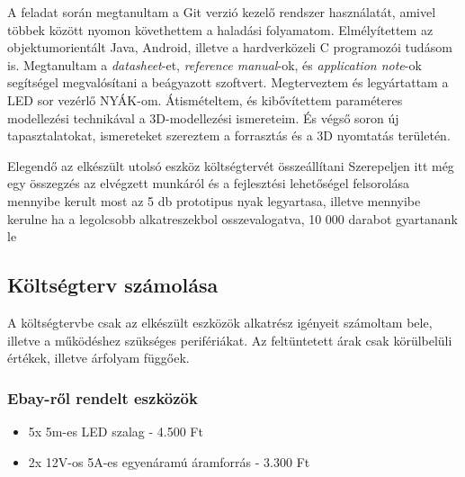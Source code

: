 \documentclass[../main.tex]{subfiles}
\begin{document}
        A feladat során megtanultam a Git verzió kezelő rendszer használatát, amivel többek között nyomon követhettem a haladási folyamatom.
        Elmélyítettem az objektumorientált Java, Android, illetve a hardverközeli C programozói tudásom is. Megtanultam a \textit{datasheet}-et, \textit{reference manual}-ok, és \textit{application note}-ok segítségel megvalósítani a beágyazott szoftvert. Megterveztem és legyártattam a LED sor vezérlő NYÁK-om. Átismételtem, és kibővítettem paraméteres modellezési technikával a 3D-modellezési ismereteim.
        És végső soron új tapasztalatokat, ismereteket szereztem a forrasztás és a 3D nyomtatás területén. 
        
        
    

Elegendő az elkészült utolsó eszköz költségtervét összeállítani
Szerepeljen itt még egy összegzés az elvégzett munkáról és a fejlesztési lehetőségel felsorolása
    mennyibe kerult most az 5 db prototipus nyak legyartasa, illetve mennyibe kerulne ha a legolcsobb alkatreszekbol osszevalogatva, 10 000 darabot gyartanank le
    
    \subsection{Költségterv számolása}
        A költségtervbe csak az elkészült eszközök alkatrész igényeit számoltam bele, illetve a működéshez szükséges perifériákat. Az feltüntetett árak csak körülbelüli értékek, illetve árfolyam függőek.
        \subsubsection{Ebay-ről rendelt eszközök}
            \begin{itemize}
                \item 5x 5m-es LED szalag - 4.500 Ft
                \item 2x 12V-os 5A-es egyenáramú áramforrás - 3.300 Ft
            \end{itemize}
\end{document}
